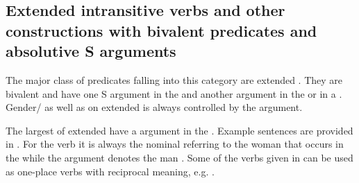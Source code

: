 
\subsection{Extended intransitive verbs and other constructions with bivalent predicates and absolutive S arguments}
\label{sec:Extended intransitive verbs}
The major class of predicates falling into this category are extended . They are bivalent and have one S argument in the  and another argument in the  or in a . Gender/ as well as  on extended  is always controlled by the  argument.

The largest  of extended  have a  argument in the  . Example sentences are provided in . For the verb   it is always the nominal referring to the woman that occurs in the  while the  argument denotes the man . Some of the verbs given in  can be used as one-place verbs with reciprocal meaning, e.g.  .
%
